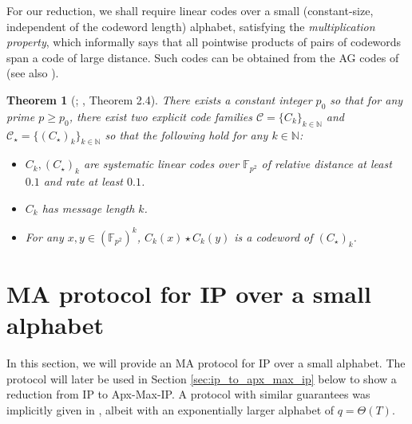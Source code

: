 \documentclass[11pt]{article}
\theoremstyle{plain}
\newtheorem{thm}{Theorem}[section]
\theoremstyle{remark}
\newcommand{\N}{\mathbb{N}}
\newcommand{\calC}{\mathcal{C}}
\newcommand{\F}{\mathbb{F}}
\begin{document}
For our reduction, we shall require linear codes over a small (constant-size, independent of the codeword length) alphabet, satisfying the \emph{multiplication property}, which informally says that all pointwise products of pairs of codewords span a code of large distance. 
Such codes can be obtained from the AG codes of \cite{SAKSD01} (see also \cite[Theorem 2.4]{Rub18}).

\begin{thm}[\cite{SAKSD01}; \cite{Rub18}, Theorem 2.4]\label{thm:ag}
There exists a constant integer $p_0$ so that for any prime $p \geq p_0$, there exist two explicit code families $\calC=\{C_k\}_{k \in \N}$ and $\calC_{\star}= \{(C_{\star})_k\}_{k \in \N}$ so that the following hold for any $k \in \N$:
\begin{itemize}
\item $C_k, (C_\star)_k$ are  systematic linear codes over $\F_{p^2}$ of  relative distance at least $0.1$ and rate at least $0.1$.
\item $C_k$ has message length $k$.
\item For any $x,y\in (\F_{p^2})^k$, $C_k(x) \star  C_k(y)$ is a codeword of $(C_\star)_k$. 
\end{itemize}
\end{thm}


 
\section{MA protocol for IP over a small alphabet}\label{sec:ma}

In this section, we will provide an MA protocol for IP over a small alphabet. The protocol will later be used in Section \ref{sec:ip_to_apx_max_ip} below to show a reduction from IP to Apx-Max-IP. A  protocol with similar guarantees was implicitly given in \cite{CW19}, albeit with an exponentially larger alphabet of  $q=\Theta(T)$. 
\end{document}

